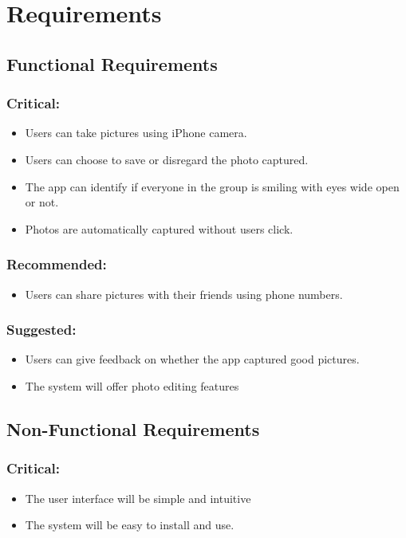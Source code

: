 \chapter{Requirements}

\section{Functional Requirements}
\subsection{Critical:}
\begin{itemize}
 \item Users can take pictures using iPhone camera.
 \item Users can choose to save or disregard the photo captured.
 \item The app can identify if everyone in the group is smiling with eyes wide open or not.
 \item Photos are automatically captured without users click.
 \end{itemize}
 
\subsection{Recommended:}
\begin{itemize}
\item Users can share pictures with their friends using phone numbers.
 \end{itemize}
 
\subsection{Suggested:}
\begin{itemize}
\item Users can give feedback on whether the app captured good pictures.
\item The system will offer photo editing features
 \end{itemize}
 
\section{Non-Functional Requirements}
\subsection{Critical:}
\begin{itemize}
\item The user interface will be simple and intuitive 
\item The system will be easy to install and use.
 \end{itemize}
 
